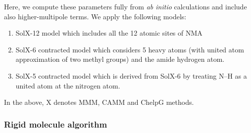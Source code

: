 \documentclass[a4paper,titlepage,twoside,fleqn,12pt]{book}
\begin{document}
\begin{refsection}
Here, we compute these
parameters fully from \emph{ab initio} calculations and include also 
higher\hyp{}multipole terms. We apply the following models:
%
\begin{enumerate}
 \item SolX-12 model which includes all the 12 atomic sites of NMA
 \item SolX-6 contracted model which considers 5 heavy atoms (with united
       atom approximation of two methyl groups) and the
       amide hydrogen atom.
 \item SolX-5 contracted model which is derived from SolX-6 by treating N--H
       as a united atom at the nitrogen atom.
\end{enumerate}
%
In the above, X denotes MMM, CAMM and ChelpG methods. 

\subsubsection{Rigid molecule algorithm}


\end{refsection}
\end{document}
